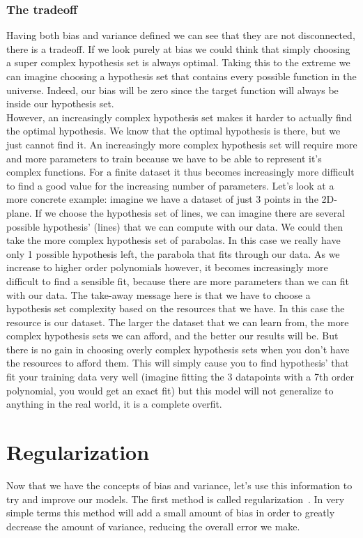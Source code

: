 \subsubsection{The tradeoff}
Having both bias and variance defined we can see that they are not disconnected, there is a tradeoff. If we look purely at bias we could think that simply choosing a super complex hypothesis set is always optimal. Taking this to the extreme we can imagine choosing a hypothesis set that contains every possible function in the universe. Indeed, our bias will be zero since the target function will always be inside our hypothesis set. \\
However, an increasingly complex hypothesis set makes it harder to actually find the optimal hypothesis. We know that the optimal hypothesis is there, but we just cannot find it. An increasingly more complex hypothesis set will require more and more parameters to train because we have to be able to represent it's complex functions. For a finite dataset it thus becomes increasingly more difficult to find a good value for the increasing number of parameters. Let's look at a more concrete example: imagine we have a dataset of just 3 points in the 2D-plane. If we choose the hypothesis set of lines, we can imagine there are several possible hypothesis' (lines) that we can compute with our data. We could then take the more complex hypothesis set of parabolas. In this case we really have only 1 possible hypothesis left, the parabola that fits through our data. As we increase to higher order polynomials however, it becomes increasingly more difficult to find a sensible fit, because there are more parameters than we can fit with our data. The take-away message here is that we have to choose a hypothesis set complexity based on the resources that we have. In this case the resource is our dataset. The larger the dataset that we can learn from, the more complex hypothesis sets we can afford, and the better our results will be. But there is no gain in choosing overly complex hypothesis sets when you don't have the resources to afford them. This will simply cause you to find hypothesis' that fit your training data very well (imagine fitting the 3 datapoints with a 7th order polynomial, you would get an exact fit) but this model will not generalize to anything in the real world, it is a complete overfit.
\section{Regularization}
\label{sec:glm-regularization}
Now that we have the concepts of bias and variance, let's use this information to try and improve our models. The first method is called regularization~\cite{caltechmachinelearning}\cite{zou2005regularization}\cite{friedman2010regularization}. In very simple terms this method will add a small amount of bias in order to greatly decrease the amount of variance, reducing the overall error we make.
